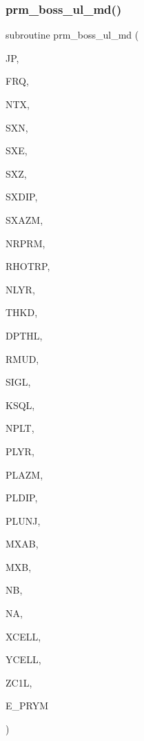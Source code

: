 \subsubsection{\texorpdfstring{prm\+\_\+boss\+\_\+ul\+\_\+md()}{prm\_boss\_ul\_md()}}
{\footnotesize\ttfamily subroutine prm\+\_\+boss\+\_\+ul\+\_\+md (\begin{DoxyParamCaption}\item[{integer}]{JP,  }\item[{real}]{F\+RQ,  }\item[{integer}]{N\+TX,  }\item[{real, dimension(ntx)}]{S\+XN,  }\item[{real, dimension(ntx)}]{S\+XE,  }\item[{real, dimension(ntx)}]{S\+XZ,  }\item[{real, dimension(ntx)}]{S\+X\+D\+IP,  }\item[{real, dimension(ntx)}]{S\+X\+A\+ZM,  }\item[{integer}]{N\+R\+P\+RM,  }\item[{real, dimension(nrprm)}]{R\+H\+O\+T\+RP,  }\item[{integer}]{N\+L\+YR,  }\item[{real(kind=ql), dimension(nlyr)}]{T\+H\+KD,  }\item[{real(kind=ql), dimension(nlyr)}]{D\+P\+T\+HL,  }\item[{real(kind=ql), dimension(0\+:nlyr)}]{R\+M\+UD,  }\item[{complex(kind=ql), dimension (nlyr)}]{S\+I\+GL,  }\item[{complex(kind=ql), dimension (nlyr)}]{K\+S\+QL,  }\item[{integer}]{N\+P\+LT,  }\item[{integer, dimension(nplt)}]{P\+L\+YR,  }\item[{real, dimension (nplt)}]{P\+L\+A\+ZM,  }\item[{real, dimension (nplt)}]{P\+L\+D\+IP,  }\item[{real, dimension (nplt)}]{P\+L\+U\+NJ,  }\item[{integer}]{M\+X\+AB,  }\item[{integer}]{M\+XB,  }\item[{integer, dimension(nplt)}]{NB,  }\item[{integer, dimension(nplt)}]{NA,  }\item[{real, dimension(mxab,nplt)}]{X\+C\+E\+LL,  }\item[{real, dimension(mxab,nplt)}]{Y\+C\+E\+LL,  }\item[{real, dimension(mxb)}]{Z\+C1L,  }\item[{complex, dimension(2,mxab,ntx,nplt)}]{E\+\_\+\+P\+R\+YM }\end{DoxyParamCaption})}

